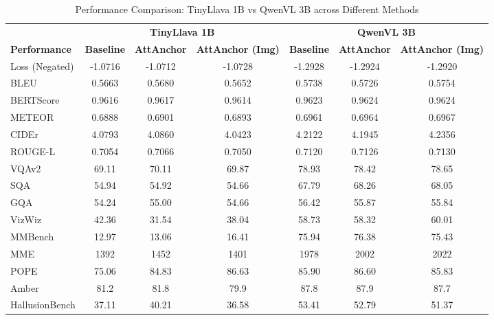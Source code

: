 \documentclass[11pt]{article}
\begin{document}
\label{app:qwen_results}

\begin{table}[H]
\centering
\caption{Performance Comparison: TinyLlava 1B vs QwenVL 3B across Different Methods}
\small
\begin{tabular}{@{}l|ccc|ccc@{}}
\toprule
& \multicolumn{3}{c|}{\textbf{TinyLlava 1B}} & \multicolumn{3}{c}{\textbf{QwenVL 3B}} \\
\textbf{Performance} & \textbf{Baseline} & \textbf{AttAnchor} & \textbf{AttAnchor (Img)} & \textbf{Baseline} & \textbf{AttAnchor} & \textbf{AttAnchor (Img)} \\
\midrule
Loss (Negated) & -1.0716 & \textcolor{customgreen}{-1.0712} & -1.0728 & -1.2928 & -1.2924 & \textcolor{customgreen}{-1.2920} \\
BLEU & 0.5663 & \textcolor{customgreen}{0.5680} & 0.5652 & 0.5738 & 0.5726 & \textcolor{customgreen}{0.5754} \\
BERTScore & 0.9616 & \textcolor{customgreen}{0.9617} & 0.9614 & 0.9623 & \textcolor{customgreen}{0.9624} & 0.9624 \\
METEOR & 0.6888 & \textcolor{customgreen}{0.6901} & 0.6893 & 0.6961 & 0.6964 & \textcolor{customgreen}{0.6967} \\
CIDEr & 4.0793 & \textcolor{customgreen}{4.0860} & 4.0423 & 4.2122 & 4.1945 & \textcolor{customgreen}{4.2356} \\
ROUGE-L & 0.7054 & \textcolor{customgreen}{0.7066} & 0.7050 & 0.7120 & 0.7126 & \textcolor{customgreen}{ 0.7130} \\

VQAv2 & 69.11 & \textcolor{customgreen}{70.11} & 69.87 & \textcolor{customgreen}{ 78.93} & 78.42 & 78.65 \\

SQA & \textcolor{customgreen}{54.94} & 54.92 & 54.66 & 67.79 & \textcolor{customgreen}{68.26} & 68.05 \\
GQA & 54.24 & \textcolor{customgreen}{55.00} & 54.66 & \textcolor{customgreen}{56.42} & 55.87 & 55.84 \\
VizWiz & \textcolor{customgreen}{42.36} & 31.54 & 38.04 & 58.73 & 58.32 & \textcolor{customgreen}{60.01} \\

MMBench & 12.97 & 13.06 & \textcolor{customgreen}{16.41} & 75.94 & \textcolor{customgreen}{76.38} & 75.43 \\
MME & 1392 & \textcolor{customgreen}{1452} & 1401 & 1978 & 2002 & \textcolor{customgreen}{2022} \\

POPE & 75.06 & 84.83 & \textcolor{customgreen}{86.63} & 85.90 & \textcolor{customgreen}{86.60} & 85.83 \\
Amber & 81.2 & \textcolor{customgreen}{81.8} & 79.9 & 87.8 & \textcolor{customgreen}{87.9} &  87.7 \\
HallusionBench & 37.11 & \textcolor{customgreen}{40.21} & 36.58 & \textcolor{customgreen}{53.41} & 52.79 & 51.37 \\


\bottomrule
\end{tabular}
\label{tab:qwenmodel_comparison}
\end{table}
\end{document}
